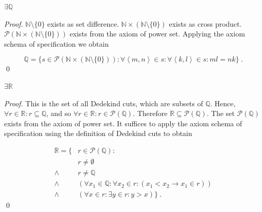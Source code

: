 \documentclass[11pt]{llncs}
\begin{document}
\begin{lemma}
$\exists \mathbb{Q}$
\end{lemma}
\begin{proof}
$\mathbb{N} \setminus \{0\}$ exists as set difference.
$\mathbb{N} \times (\mathbb{N} \setminus \{0\})$ exists as cross product.
$\mathcal{P}(\mathbb{N} \times (\mathbb{N} \setminus \{0\}))$ exists from the
axiom of power set. Applying the axiom schema of specification we obtain

\[
\mathbb{Q} = \{s \in \mathcal{P}(\mathbb{N} \times (\mathbb{N} \setminus \{0\})):
               \forall \left<m, n\right> \in s: \forall \left<k, l\right> \in s:
               ml = nk\}~.
\]
\qed
\end{proof}

\begin{lemma}
$\exists \mathbb{R}$
\end{lemma}
\begin{proof}
This is the set of all Dedekind cuts, which
are subsets of $\mathbb{Q}$. Hence,
$\forall r \in \mathbb{R}: r \subseteq \mathbb{Q}$, and so
$\forall r \in \mathbb{R}: r \in \mathcal{P}(\mathbb{Q})$. Therefore
$\mathbb{R} \subseteq \mathcal{P}(\mathbb{Q})$. The set
$\mathcal{P}(\mathbb{Q})$ exists from the axiom of power set. It suffices to
apply the axiom schema of specification using the definition of Dedekind cuts to
obtain

\begin{align*}
\mathbb{R} = \{&r \in \mathcal{P}(\mathbb{Q}): \\
               &r \neq \emptyset\\
         \land &r \neq \mathbb{Q}\\
         \land &(\forall x_1 \in \mathbb{Q}: \forall x_2 \in r: (x_1 < x_2 \rightarrow x_1 \in r))\\
         \land &(\forall x \in r: \exists y \in r: y > x)
              \}~.
\end{align*}
\qed
\end{proof}
\end{document}
